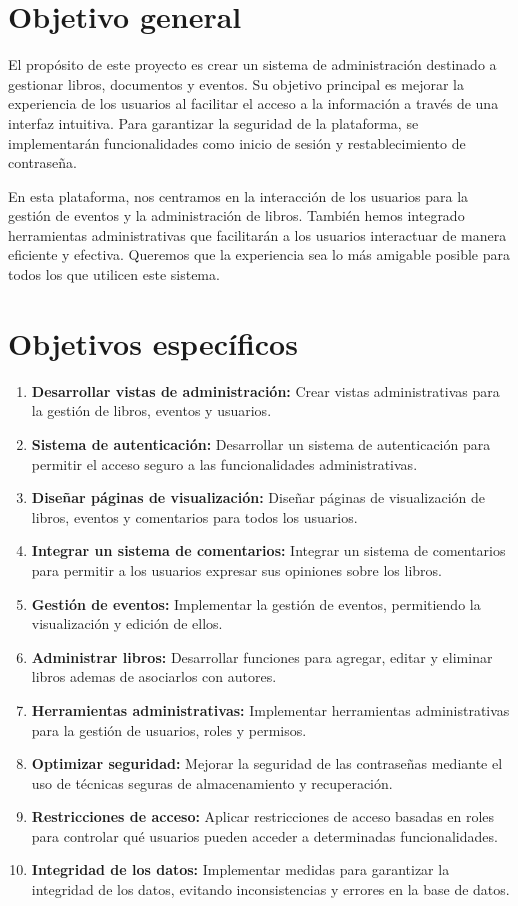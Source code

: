 \documentclass[a4paper, 12pt]{book}
\begin{document}
\section{Objetivo general} %
\label{sec:objetivo-general} %
El propósito de este proyecto es crear un sistema de administración destinado a gestionar libros, documentos y eventos. 
Su objetivo principal es mejorar la experiencia de los usuarios al facilitar el acceso a la información a través de una 
interfaz intuitiva. Para garantizar la seguridad de la plataforma, se implementarán funcionalidades como inicio de sesión 
y restablecimiento de contraseña.

En esta plataforma, nos centramos en la interacción de los usuarios para la gestión de eventos y la administración de libros. 
También hemos integrado herramientas administrativas que facilitarán a los usuarios interactuar de manera eficiente y efectiva. 
Queremos que la experiencia sea lo más amigable posible para todos los que utilicen este sistema.
\section{Objetivos específicos}
\label{sec:objetivos-especificos}
\begin{enumerate}
  \item \textbf{Desarrollar vistas de administración:} Crear vistas administrativas para la gestión de libros, eventos y usuarios.
  \item \textbf{Sistema de autenticación:} Desarrollar un sistema de autenticación para permitir el acceso seguro a las funcionalidades administrativas.
  \item \textbf{Diseñar páginas de visualización:} Diseñar páginas de visualización de libros, eventos y comentarios para todos los usuarios.
  \item \textbf{Integrar un sistema de comentarios:} Integrar un sistema de comentarios para permitir a los usuarios expresar sus opiniones sobre los libros.
  \item \textbf{Gestión de eventos:} Implementar la gestión de eventos, permitiendo la visualización y edición de ellos.
  \item \textbf{Administrar libros:} Desarrollar funciones para agregar, editar y eliminar libros ademas de asociarlos con autores.
  \item \textbf{Herramientas administrativas:} Implementar herramientas administrativas para la gestión de usuarios, roles y permisos.
  \item \textbf{Optimizar seguridad:} Mejorar la seguridad de las contraseñas mediante el uso de técnicas seguras de almacenamiento y recuperación.
  \item \textbf{Restricciones de acceso:} Aplicar restricciones de acceso basadas en roles para controlar qué usuarios pueden acceder a determinadas funcionalidades.
  \item \textbf{Integridad de los datos:} Implementar medidas para garantizar la integridad de los datos, evitando inconsistencias y errores en la base de datos.
\end{enumerate}
\end{document}
